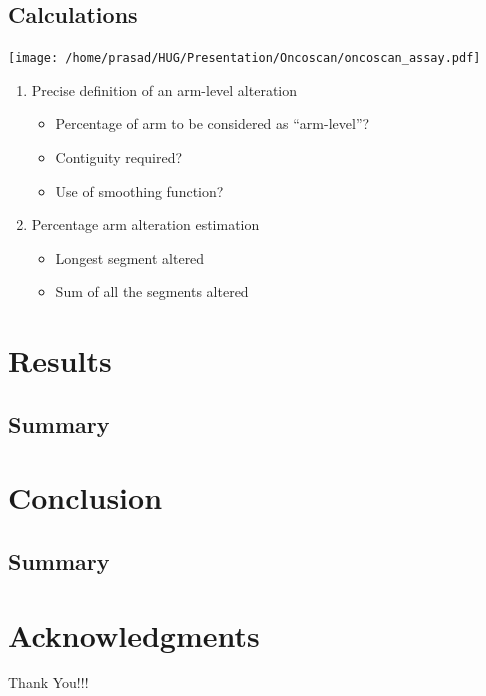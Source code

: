 \documentclass{beamer}
\begin{document}
				\subsection{Calculations}
				\begin{frame}
				\begin{mysidebyside}[blanker, lefthand width=.3\linewidth]
				\texttt{[image: /home/prasad/HUG/Presentation/Oncoscan/oncoscan\_assay.pdf]}
				\tcblower
				\pause
				\begin{enumerate}
				\item Precise definition of an arm-level alteration
				\pause
				\begin{itemize}								
					\item Percentage of arm to be considered as ``arm-level''?
					\item Contiguity required?
					\item Use of smoothing function?
				\end{itemize}
				\pause
				\item Percentage arm alteration estimation
				\begin{itemize}
				\item Longest segment altered
				\item Sum of all the segments altered 
				\end{itemize}
				\end{enumerate}
				\end{mysidebyside} 
				\end{frame}
	
\section{Results}
                \subsection{Summary}

               \begin{frame}

               \end{frame}

	
\section{Conclusion}
                \subsection{Summary}

               \begin{frame}

               \end{frame}

\section{Acknowledgments}
			\begin{frame}{}
			\huge
			\begin{center}
			Thank You!!!
			\end{center}
			\end{frame}
\end{document}
